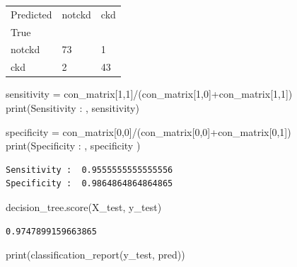 \documentclass[
  11pt,
  letterpaper,
  DIV=11,
  numbers=noendperiod]{scrartcl}
\newenvironment{Shaded}{\begin{snugshade}}{\end{snugshade}}
\newcommand{\BuiltInTok}[1]{\textcolor[rgb]{0.00,0.23,0.31}{#1}}
\newcommand{\DecValTok}[1]{\textcolor[rgb]{0.68,0.00,0.00}{#1}}
\newcommand{\NormalTok}[1]{\textcolor[rgb]{0.00,0.23,0.31}{#1}}
\newcommand{\OperatorTok}[1]{\textcolor[rgb]{0.37,0.37,0.37}{#1}}
\newcommand{\StringTok}[1]{\textcolor[rgb]{0.13,0.47,0.30}{#1}}
\begin{document}
\begin{longtable}[]{@{}lll@{}}
\toprule\noalign{}
Predicted & notckd & ckd \\
True & & \\
\midrule\noalign{}
\endhead
\bottomrule\noalign{}
\endlastfoot
notckd & 73 & 1 \\
ckd & 2 & 43 \\
\end{longtable}

\begin{Shaded}
\begin{Highlighting}[]
\NormalTok{sensitivity }\OperatorTok{=}\NormalTok{ con\_matrix[}\DecValTok{1}\NormalTok{,}\DecValTok{1}\NormalTok{]}\OperatorTok{/}\NormalTok{(con\_matrix[}\DecValTok{1}\NormalTok{,}\DecValTok{0}\NormalTok{]}\OperatorTok{+}\NormalTok{con\_matrix[}\DecValTok{1}\NormalTok{,}\DecValTok{1}\NormalTok{])}
\BuiltInTok{print}\NormalTok{(}\StringTok{\textquotesingle{}Sensitivity : \textquotesingle{}}\NormalTok{, sensitivity)}

\NormalTok{specificity }\OperatorTok{=}\NormalTok{ con\_matrix[}\DecValTok{0}\NormalTok{,}\DecValTok{0}\NormalTok{]}\OperatorTok{/}\NormalTok{(con\_matrix[}\DecValTok{0}\NormalTok{,}\DecValTok{0}\NormalTok{]}\OperatorTok{+}\NormalTok{con\_matrix[}\DecValTok{0}\NormalTok{,}\DecValTok{1}\NormalTok{])}
\BuiltInTok{print}\NormalTok{(}\StringTok{\textquotesingle{}Specificity : \textquotesingle{}}\NormalTok{, specificity )}
\end{Highlighting}
\end{Shaded}

\begin{verbatim}
Sensitivity :  0.9555555555555556
Specificity :  0.9864864864864865
\end{verbatim}

\begin{Shaded}
\begin{Highlighting}[]
\NormalTok{decision\_tree.score(X\_test, y\_test)}
\end{Highlighting}
\end{Shaded}

\begin{verbatim}
0.9747899159663865
\end{verbatim}

\begin{Shaded}
\begin{Highlighting}[]
\BuiltInTok{print}\NormalTok{(classification\_report(y\_test, pred))}
\end{Highlighting}
\end{Shaded}
\end{document}
